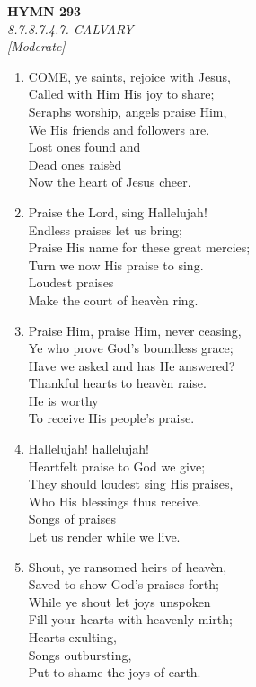 \documentclass[11pt,a4paper]{article}
\begin{document}
\newpage
\begin{center}
    {\Large \textbf{HYMN 293}}
    \\
    \textit{8.7.8.7.4.7. CALVARY}
    \\
    \textit{\small [Moderate]}
\end{center}
\vspace{1em}

\begin{enumerate}
    \item COME, ye saints, rejoice with Jesus, \\
        Called with Him His joy to share; \\
        Seraphs worship, angels praise Him, \\
        We His friends and followers are. \\
        Lost ones found and \\
        Dead ones rais\`ed \\
        Now the heart of Jesus cheer.

    \item Praise the Lord, sing Hallelujah! \\
        Endless praises let us bring; \\
        Praise His name for these great mercies; \\
        Turn we now His praise to sing. \\
        Loudest praises \\
        Make the court of heav\`en ring.

    \item Praise Him, praise Him, never ceasing, \\
        Ye who prove God's boundless grace; \\
        Have we asked and has He answered? \\
        Thankful hearts to heav\`en raise. \\
        He is worthy \\
        To receive His people's praise.

    \item Hallelujah! hallelujah! \\
        Heartfelt praise to God we give; \\
        They should loudest sing His praises, \\
        Who His blessings thus receive. \\
        Songs of praises \\
        Let us render while we live.

    \item Shout, ye ransomed heirs of heav\`en, \\
        Saved to show God's praises forth; \\
        While ye shout let joys unspoken \\
        Fill your hearts with heavenly mirth; \\
        Hearts exulting, \\
        Songs outbursting, \\
        Put to shame the joys of earth.

\end{enumerate}
\end{document}
